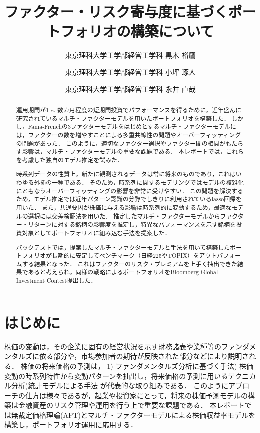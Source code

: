 \documentclass[11pt]{jreport}
\begin{document}
\title{ファクター・リスク寄与度に基づくポートフォリオの構築について\\}
\author{東京理科大学工学部経営工学科 \quad 黒木 裕鷹 \and 東京理科大学工学部経営工学科 \quad 小坪 琢人 \and 東京理科大学工学部経営工学科 \quad 永井 直哉}
\maketitle
\begin{abstract}

運用期間が1 $\sim$ 数カ月程度の短期間投資でパフォーマンスを得るために，近年盛んに研究されているマルチ・ファクターモデルを用いたポートフォリオを構築した．
しかし，Fama-Frenchの3ファクターモデルをはじめとするマルチ・ファクターモデルには，ファクターの数を増やすことによる多重共線性の問題やオーバーフィッティングの問題があった．
このように，適切なファクター選択やファクター間の相関がもたらす影響は，マルチ・ファクターモデルの重要な課題である．
本レポートでは，これらを考慮した独自のモデル推定を試みた．

時系列データの性質上，新たに観測されるデータは常に将来のものであり，これはいわゆる外挿の一種である．
そのため，時系列に関するモデリングではモデルの複雑化にともなうオーバーフィッティングの影響を非常に受けやすい．
この問題を解決するため，モデル推定では近年パターン認識の分野でしきりに利用されているlasso回帰を用いた．
また，共通要因が株価に与える影響は時系列的に変動するため，最適なモデルの選択には交差検証法を用いた．
推定したマルチ・ファクターモデルからファクター・リターンに対する銘柄の影響度を推定し，特異なパフォーマンスを示す銘柄を投資対象としてポートフォリオに組み込む手法を提案した．

バックテストでは，提案したマルチ・ファクターモデルと手法を用いて構築したポートフォリオが長期的に安定してベンチマーク（日経225やTOPIX）をアウトパフォームする結果となった． 
これはファクターのリスク・プレミアムを上手く抽出できた結果であると考えられ，同様の戦略によるポートフォリオをBloomberg Global Investment Contest提出した．
\end{abstract}










\chapter{はじめに}
株価の変動は，その企業に固有の経営状況を示す財務諸表や業種等のファンダメンタルズに依る部分や，市場参加者の期待が反映された部分などにより説明される．
株価の将来価格の予測は，
1) ファンダメンタルズ分析に基づく手法) 株価変動の時系列特性から変動パターンを抽出し，将来価格の予測に用いるテクニカル分析)統計モデルによる手法\quad
が代表的な取り組みである．
このようにアプローチの仕方は様々であるが，起業や投資家にとって，将来の株価予測モデルの構築は金融資産のリスク管理や運用を行う上で重要な課題である．
本レポートでは無裁定価格理論(APT)とマルチ・ファクターモデルによる株価収益率モデルを構築し，ポートフォリオ運用に応用する．
\end{document}
